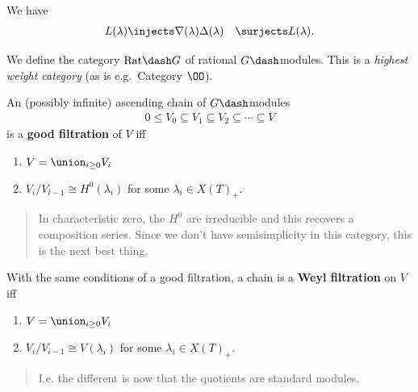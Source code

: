 We have
\begin{align*}  
L(\lambda) &\injects \nabla(\lambda)
\Delta(\lambda) &\surjects L(\lambda)
.\end{align*}

We define the category \(\text{Rat}\dash G\) of rational
\(G\dash\)modules. This is a \emph{highest weight category} (as is
e.g.~Category \(\OO\)).

\begin{definition}

An (possibly infinite) ascending chain of \(G\dash\)modules
\begin{align*}  
0 \leq V_0 \subseteq V_1 \subseteq V_2 \subseteq \cdots \subseteq V
\end{align*} is a \textbf{good filtration} of \(V\) iff

\begin{enumerate}
\def\labelenumi{\arabic{enumi}.}
\item
  \(V = \union_{i\geq 0} V_i\)
\item
  \(V_i/V_{i-1} \cong H^0(\lambda_i)\) for some
  \(\lambda_i \in X(T)_+\).
\end{enumerate}

\begin{quote}
In characteristic zero, the \(H^0\) are irreducible and this recovers a
composition series. Since we don't have semisimplicity in this category,
this is the next best thing.
\end{quote}

\end{definition}

\begin{definition}

With the same conditions of a good filtration, a chain is a \textbf{Weyl
filtration} on \(V\) iff

\begin{enumerate}
\def\labelenumi{\arabic{enumi}.}
\item
  \(V = \union_{i\geq 0} V_i\)
\item
  \(V_i/V_{i-1} \cong V(\lambda_i)\) for some \(\lambda_i \in X(T)_+\).
\end{enumerate}

\begin{quote}
I.e. the different is now that the quotients are standard modules.
\end{quote}

\end{definition}

